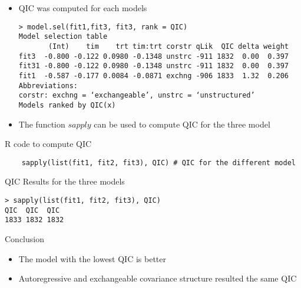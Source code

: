 \documentclass{beamer}
\begin{document}
\begin{frame}[fragile]{}
\begin{itemize}
	\item QIC was computed for each models 
	\scriptsize
	\begin{verbatim}
> model.sel(fit1,fit3, fit3, rank = QIC)
Model selection table 
       (Int)    tim    trt tim:trt corstr qLik  QIC delta weight
fit3  -0.800 -0.122 0.0980 -0.1348 unstrc -911 1832  0.00  0.397
fit31 -0.800 -0.122 0.0980 -0.1348 unstrc -911 1832  0.00  0.397
fit1  -0.587 -0.177 0.0084 -0.0871 exchng -906 1833  1.32  0.206
Abbreviations:
corstr: exchng = ‘exchangeable’, unstrc = ‘unstructured’
Models ranked by QIC(x) 
	\end{verbatim}
\end{itemize}
\end{frame}

\begin{frame}[fragile]{}
\begin{itemize}
	\item The function $sapply$ can be used to compute QIC for the three model
\end{itemize}
{\color{red} R code to compute QIC}
	\begin{verbatim}
	sapply(list(fit1, fit2, fit3), QIC) # QIC for the different model
	\end{verbatim}
	 
	{\color{red} QIC Results for the three models}
	\begin{verbatim}
> sapply(list(fit1, fit2, fit3), QIC)
QIC  QIC  QIC 
1833 1832 1832 
	\end{verbatim}

\end{frame}

\begin{frame}{Conclusion}
\begin{itemize}
	\item The model with the lowest QIC is better \vspace{0.5cm}
	\item Autoregressive and exchangeable covariance structure resulted the same QIC
\end{itemize}
\end{frame}
\end{document}
